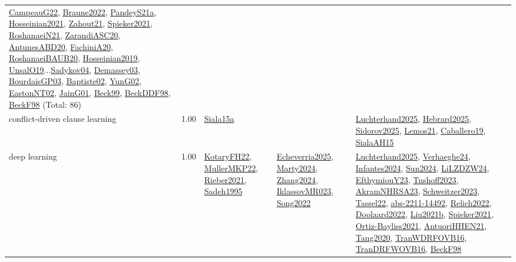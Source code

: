 {\begin{longtable}{p{3cm}r>{\raggedright\arraybackslash}p{6cm}>{\raggedright\arraybackslash}p{6cm}>{\raggedright\arraybackslash}p{8cm}}
\hyperref[detail:CampeauG22]{CampeauG22}, \hyperref[detail:Braune2022]{Braune2022}, \hyperref[detail:PandeyS21a]{PandeyS21a}, \hyperref[detail:Hosseinian2021]{Hosseinian2021}, \hyperref[detail:Zahout21]{Zahout21}, \hyperref[detail:Spieker2021]{Spieker2021}, \hyperref[detail:RoshanaeiN21]{RoshanaeiN21}, \hyperref[detail:ZarandiASC20]{ZarandiASC20}, \hyperref[detail:AntunesABD20]{AntunesABD20}, \hyperref[detail:FachiniA20]{FachiniA20}, \hyperref[detail:RoshanaeiBAUB20]{RoshanaeiBAUB20}, \hyperref[detail:Hosseinian2019]{Hosseinian2019}, \hyperref[detail:UnsalO19]{UnsalO19}...\hyperref[detail:Sadykov04]{Sadykov04}, \hyperref[detail:Demassey03]{Demassey03}, \hyperref[detail:BourdaisGP03]{BourdaisGP03}, \hyperref[detail:Baptiste02]{Baptiste02}, \hyperref[detail:YunG02]{YunG02}, \hyperref[detail:EastonNT02]{EastonNT02}, \hyperref[detail:JainG01]{JainG01}, \hyperref[detail:Beck99]{Beck99}, \hyperref[detail:BeckDDF98]{BeckDDF98}, \hyperref[detail:BeckF98]{BeckF98} (Total: 86)\\
\index{conflict-driven clause learning}\index{Algorithms!conflict-driven clause learning}conflict-driven clause learning &  1.00 & \hyperref[detail:Siala15a]{Siala15a} &  & \hyperref[detail:Luchterhand2025]{Luchterhand2025}, \hyperref[detail:Hebrard2025]{Hebrard2025}, \hyperref[detail:Sidorov2025]{Sidorov2025}, \hyperref[detail:Lemos21]{Lemos21}, \hyperref[detail:Caballero19]{Caballero19}, \hyperref[detail:SialaAH15]{SialaAH15}\\
\index{deep learning}\index{Algorithms!deep learning}deep learning &  1.00 & \hyperref[detail:KotaryFH22]{KotaryFH22}, \hyperref[detail:MullerMKP22]{MullerMKP22}, \hyperref[detail:Rieber2021]{Rieber2021}, \hyperref[detail:Sadeh1995]{Sadeh1995} & \hyperref[detail:Echeverria2025]{Echeverria2025}, \hyperref[detail:Marty2024]{Marty2024}, \hyperref[detail:Zhang2024]{Zhang2024}, \hyperref[detail:IklassovMR023]{IklassovMR023}, \hyperref[detail:Song2022]{Song2022} & \hyperref[detail:Luchterhand2025]{Luchterhand2025}, \hyperref[detail:Verhaeghe24]{Verhaeghe24}, \hyperref[detail:Infantes2024]{Infantes2024}, \hyperref[detail:Sun2024]{Sun2024}, \hyperref[detail:LiLZDZW24]{LiLZDZW24}, \hyperref[detail:EfthymiouY23]{EfthymiouY23}, \hyperref[detail:Tnshoff2023]{Tnshoff2023}, \hyperref[detail:AkramNHRSA23]{AkramNHRSA23}, \hyperref[detail:Schweitzer2023]{Schweitzer2023}, \hyperref[detail:Tassel22]{Tassel22}, \hyperref[detail:abs-2211-14492]{abs-2211-14492}, \hyperref[detail:Relich2022]{Relich2022}, \hyperref[detail:Doolaard2022]{Doolaard2022}, \hyperref[detail:Liu2021b]{Liu2021b}, \hyperref[detail:Spieker2021]{Spieker2021}, \hyperref[detail:Ortiz-Bayliss2021]{Ortiz-Bayliss2021}, \hyperref[detail:AntuoriHHEN21]{AntuoriHHEN21}, \hyperref[detail:Tang2020]{Tang2020}, \hyperref[detail:TranWDRFOVB16]{TranWDRFOVB16}, \hyperref[detail:TranDRFWOVB16]{TranDRFWOVB16}, \hyperref[detail:BeckF98]{BeckF98}\\

\end{longtable}}
